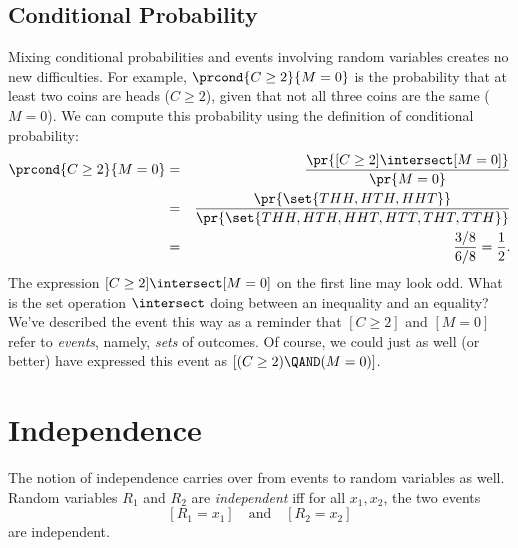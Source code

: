 \begin{editingnotes}
\subsection{Conditional Probability}

Mixing conditional probabilities and events involving random variables
creates no new difficulties.  For example, $\prcond{C \geq 2}{M = 0}$
is the probability that at least two coins are heads ($C \geq 2$),
given that not all three coins are the same ($M = 0$).  We can compute
this probability using the definition of conditional probability:
\begin{eqnarray*}
\prcond{C \geq 2}{M = 0}
        & = &   \frac{\pr{[C \geq 2] \intersect [M = 0]}}{\pr{M = 0}} \\
        & = &   \frac{\pr{\set{THH, HTH, HHT}}}
                        {\pr{\set{THH, HTH, HHT, HTT, THT, TTH }}} \\
        & = &   \frac{3/8}{6/8} = \frac{1}{2}.
\end{eqnarray*}
The expression $[C \geq 2] \intersect [M = 0]$ on the first line may
look odd.  What is the set operation $\intersect$ doing between an
inequality and an equality?  We've described the event this way as a
reminder that $[C \geq 2]$ and $[M = 0]$ refer to \emph{events},
namely, \emph{sets} of outcomes.  Of course, we could just as well (or
better) have expressed this event as $[(C \geq 2) \QAND (M = 0)]$.

\end{editingnotes}

\section{Independence}

The notion of independence carries over from events to random variables as
well.  Random variables $R_1$ and $R_2$ are  \emph{independent} iff for all $x_1, x_2$, the two events
\[
[R_1 = x_1]  \quad \text{and}  \quad [R_2 = x_2]
\] 
are independent.

\iffalse
in the codomain of
$R_1$, and $x_2$ in the codomain of $R_2$, we have:
\[
\pr{R_1 = x_1 \QAND\ R_2 = x_2}  =  \pr{R_1 = x_1} \cdot \pr{R_2 = x_2}.
\]
As with events, we can formulate independence for random
variables in an equivalent, more intuitive way: random
variables $R_1$ and $R_2$ are independent if for all $x_1$ and $x_2$
\[
\prcond{R_1 = x_1}{R_2 = x_2}  =  \pr{R_1 = x_1}.
\]
whenever the left-hand conditional probability is defined, that is,
whenever $\pr{R_2 = x_2} > 0$.
\fi

